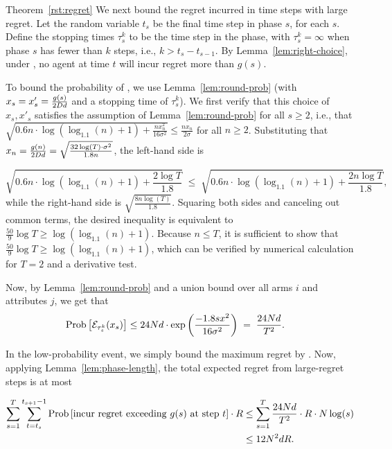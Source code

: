 \begin{emptyextraproof}{Theorem~\ref{rst:regret}}
We next bound the regret incurred in time steps with large regret.
Let the random variable $t_s$ be the final time step in phase $s$,
for each $s$. Define the stopping times $\tau_{s}^{k}$ to be the 
time step in the  phase,
with $\tau_{s}^{k} = \infty$ when phase $s$ has fewer than $k$ steps,
i.e., $k > t_{s}-t_{s-1}$.
By Lemma~\ref{lem:right-choice},
under , no agent at time $t$ will incur
regret more than $g(s)$.

To bound the probability of ,
we use Lemma~\ref{lem:round-prob}
(with $x_s = x'_s = \frac{g(s)}{2 D d}$
and a stopping time of $\tau_s^k$).
We first verify that this choice of $x_s, x'_s$
satisfies the assumption of Lemma~\ref{lem:round-prob} for all
$s \geq 2$,
i.e., that
$\sqrt{0.6 n \cdot \log (\log_{1.1}(n) + 1) + \frac{n x_n^2}{16 \sigma^2}}
\leq \frac{n x_n}{2 \sigma}$
for all $n \geq 2$.
Substituting that
$x_n = \frac{g(n)}{2 D d} = \sqrt{\frac{32\log(T) \cdot \sigma^2}{1.8 n}}$,
the left-hand side is

\[
  \sqrt{0.6 n \cdot \log (\log_{1.1}(n) + 1) + \frac{2 \log T}{1.8}}
  \; \leq \;
  \sqrt{0.6 n \cdot \log (\log_{1.1}(n) + 1) + \frac{2 n \log T}{1.8}},
\]
while the right-hand side is $\sqrt{\frac{8 n \log(T)}{1.8}}$.
Squaring both sides and canceling out common terms,
the desired inequality is equivalent to
$\frac{50}{9} \log T \geq \log(\log_{1.1}(n) + 1)$.
Because $n \leq T$, it is sufficient to show that
$\frac{50}{9} \log T \geq \log(\log_{1.1}(n) + 1)$,
which can be verified by numerical calculation for $T=2$ and a
derivative test.

Now, by Lemma~\ref{lem:round-prob} and a union bound over all arms $i$
and attributes $j$, we get that 
\begin{align*}
\Prob{\AccEU{\tau_s^k}{x_s}}
& \leq 24 \ARMNUM d \cdot \exp \left( \frac{-1.8 s x^2}{16 \sigma^2} \right)
\; = \; \frac{24 \ARMNUM d}{T^2}.
\end{align*}

In the low-probability event, we simply 
bound the maximum regret by \MAXR.
Now, applying Lemma~\ref{lem:phase-length},
the total expected regret from large-regret steps is at most

\begin{align*}
\sum_{s = 1}^T \sum_{t=t_s}^{t_{s+1}-1}
  \Prob{\mbox{incur regret exceeding } g(s) \mbox{ at step } t} \cdot \MAXR
& \leq
 \sum_{s = 1}^T \frac{24 \ARMNUM d}{T^2} \cdot \MAXR \cdot \ARMNUM \log(s)
\\ & \leq 12 \ARMNUM^2 d \MAXR.
\end{align*}


\end{emptyextraproof}
